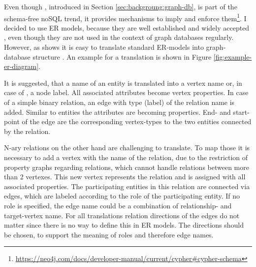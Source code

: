 Even though \neoj, introduced in Section \ref{sec:backgroung:graph-db}, is part of the schema-free noSQL trend, it provides mechanisms to imply and enforce them\footnote{\url{https://neo4j.com/docs/developer-manual/current/cypher\#cypher-schema}}.
I decided to use ER models, because they are well established and widely accepted \citep{Saake2010}, even though they are not used in the context of graph databases regularly.
However, as \citeauthor{Siriwaradhana2014} shows it is easy to translate standard ER-models into graph-database structure \citep{Siriwaradhana2014}.
An example for a translation is shown in Figure \ref{fig:example-er-diagram}.

It is suggested, that a name of an entity is translated into a vertex name or, in case of \neoj, a node label. All associated attributes become vertex properties.
In case of a simple binary relation, an edge with type (\neoj label) of the relation name is added. Similar to entities the attributes are becoming properties. End- and start-point of the edge are the corresponding vertex-types to the two entities connected by the relation.

N-ary relations on the other hand are challenging to translate. To map those it is necessary to add a vertex with the name of the relation, due to the restriction of property graphs regarding relations, which cannot handle relations between more than 2 vertexes.
This new vertex represents the relation and is assigned with all associated properties. The participating entities in this relation are connected via edges, which are labeled according to the role of the participating entity. If no role is specified, the edge name could be a combination of relationship- and target-vertex name.
For all translations relation directions of the edges do not matter since there is no way to define this in ER models. The directions should be chosen, to support the meaning of roles and therefore edge names.

